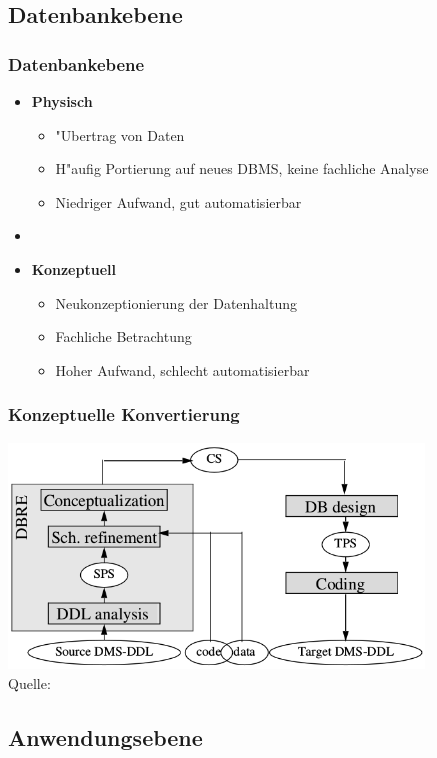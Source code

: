 \documentclass{beamer}
\begin{document}
	\subsection{Datenbankebene}
	
	\begin{frame}
		\frametitle{Datenbankebene}
		
		\begin{itemize}
			\item \textbf{Physisch}
				\begin{itemize}
					\item "Ubertrag von Daten
					\item H"aufig Portierung auf neues DBMS, keine fachliche Analyse
					\item Niedriger Aufwand, gut automatisierbar
				\end{itemize}
			\item[]
			\item \textbf{Konzeptuell}
				\begin{itemize}
					\item Neukonzeptionierung der Datenhaltung
					\item Fachliche Betrachtung
					\item Hoher Aufwand, schlecht automatisierbar
				\end{itemize}
		\end{itemize}
	\end{frame}	
	
	\begin{frame}
		\frametitle{Konzeptuelle Konvertierung}
		
		\centering
		\includegraphics[height = 6cm]{../images/strategies_fig_02b.png}\\
		\tiny Quelle: \cite{henrard-2002}
	\end{frame}
	
	\subsection{Anwendungsebene}
	
\end{document}
